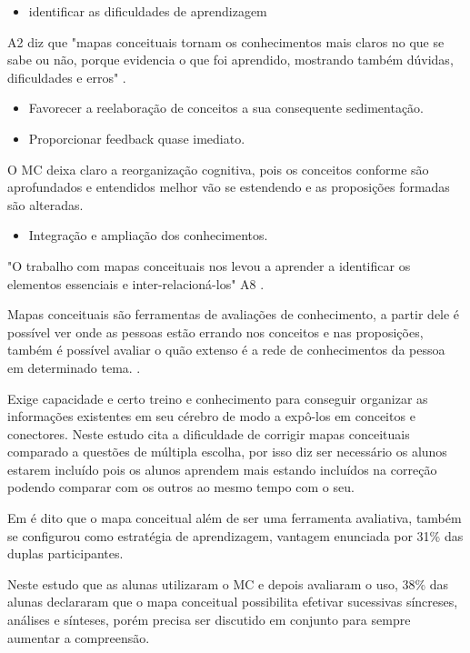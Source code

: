 \begin{itemize}
\item[]identificar as dificuldades de aprendizagem
\end{itemize}
A2 diz que "mapas conceituais tornam os conhecimentos mais claros no que se sabe ou não, porque evidencia o que foi aprendido, mostrando também dúvidas, dificuldades e erros" \cite{vantagensDesvantagensMC}.


 \begin{itemize}
\item[]Favorecer a reelaboração de conceitos a sua consequente sedimentação.
\item[]Proporcionar feedback quase imediato.
\end{itemize}


 O MC deixa claro a reorganização cognitiva, pois os conceitos conforme são aprofundados e entendidos melhor vão se estendendo e as proposições formadas são alteradas.\cite{vantagensDesvantagensMC}


 \begin{itemize}
\item[]Integração e ampliação dos conhecimentos.
\end{itemize}
"O trabalho com mapas conceituais nos levou a aprender a identificar os elementos essenciais e inter-relacioná-los" A8 \cite{vantagensDesvantagensMC}.

 Mapas conceituais são ferramentas de avaliações de conhecimento, a partir dele é possível ver onde as pessoas estão errando nos conceitos e nas proposições, também é possível avaliar o quão extenso é a rede de conhecimentos da pessoa em determinado tema. \cite{vantagensDesvantagensMC}.

 Exige capacidade e certo treino e conhecimento para conseguir organizar as informações existentes em seu cérebro de modo a expô-los em conceitos e conectores.
Neste estudo \cite{dificuldadesMapaConceitual} cita a dificuldade de corrigir mapas conceituais comparado a questões de múltipla escolha, por isso diz ser necessário os alunos estarem incluído pois os alunos aprendem mais estando incluídos na correção podendo comparar com os outros ao mesmo tempo com o seu.

Em \cite{vantagensDesvantagensMC} é dito que o mapa conceitual além de ser uma ferramenta avaliativa, também se configurou como estratégia de aprendizagem, vantagem enunciada por 31\% das duplas participantes.

Neste estudo \cite{vantagensDesvantagensMC} que as alunas utilizaram o MC e depois avaliaram o uso, 38\% das alunas declararam que o mapa conceitual possibilita efetivar sucessivas síncreses, análises e sínteses, porém precisa ser discutido em conjunto para sempre aumentar a compreensão.

